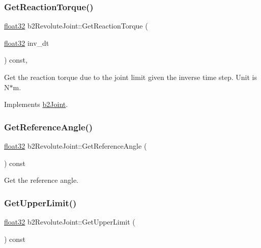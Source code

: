 \subsubsection{\texorpdfstring{GetReactionTorque()}{GetReactionTorque()}}
{\footnotesize\ttfamily \mbox{\hyperlink{b2_settings_8h_aacdc525d6f7bddb3ae95d5c311bd06a1}{float32}} b2\+Revolute\+Joint\+::\+Get\+Reaction\+Torque (\begin{DoxyParamCaption}\item[{\mbox{\hyperlink{b2_settings_8h_aacdc525d6f7bddb3ae95d5c311bd06a1}{float32}}}]{inv\+\_\+dt }\end{DoxyParamCaption}) const\hspace{0.3cm}{\ttfamily [override]}, {\ttfamily [virtual]}}

Get the reaction torque due to the joint limit given the inverse time step. Unit is N$\ast$m. 

Implements \mbox{\hyperlink{classb2_joint_ae355e441c2aa842777dc04e24f15ced0}{b2\+Joint}}.

\mbox{\label{classb2_revolute_joint_ae84b9659fe94f41f54f43d3f64ee0741}} 
\subsubsection{\texorpdfstring{GetReferenceAngle()}{GetReferenceAngle()}}
{\footnotesize\ttfamily \mbox{\hyperlink{b2_settings_8h_aacdc525d6f7bddb3ae95d5c311bd06a1}{float32}} b2\+Revolute\+Joint\+::\+Get\+Reference\+Angle (\begin{DoxyParamCaption}{ }\end{DoxyParamCaption}) const\hspace{0.3cm}{\ttfamily [inline]}}



Get the reference angle. 

\mbox{\label{classb2_revolute_joint_a5c30cf83116841607d4d819985732efb}} 
\subsubsection{\texorpdfstring{GetUpperLimit()}{GetUpperLimit()}}
{\footnotesize\ttfamily \mbox{\hyperlink{b2_settings_8h_aacdc525d6f7bddb3ae95d5c311bd06a1}{float32}} b2\+Revolute\+Joint\+::\+Get\+Upper\+Limit (\begin{DoxyParamCaption}{ }\end{DoxyParamCaption}) const}




